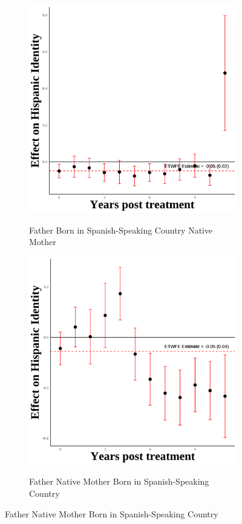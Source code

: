 \documentclass[12pt,english]{article}
\begin{document}
\begin{figure}[H]
  \begin{subfigure}[b]{0.45\textwidth}
    \centering
    \caption{Father Born in Spanish-Speaking Country Native Mother} 
    \includegraphics[width=\linewidth]{figures/secondgen-hw-hispanic_event_study.png}
    \label{fig:second-gen-hw}
  \end{subfigure}
  \hfill %
  \begin{subfigure}[b]{0.45\textwidth}
    \centering
    \caption{Father Native Mother Born in Spanish-Speaking Country}
    \includegraphics[width=\linewidth]{figures/secondgen-wh-hispanic_event_study.png}
    \label{fig:second-gen-wh}
  \end{subfigure}

\end{figure}
\end{document}
